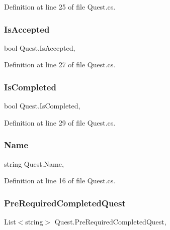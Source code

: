 Definition at line 25 of file Quest.\+cs.

\mbox{\label{class_quest_aa4cdb538ad95f876192f9e161e209448}} 
\subsubsection{\texorpdfstring{Is\+Accepted}{IsAccepted}}
{\footnotesize\ttfamily bool Quest.\+Is\+Accepted\hspace{0.3cm}{\ttfamily [get]}, {\ttfamily [set]}}



Definition at line 27 of file Quest.\+cs.

\mbox{\label{class_quest_a571b9ac9728e3fe099fef9f5b3c9b7ef}} 
\subsubsection{\texorpdfstring{Is\+Completed}{IsCompleted}}
{\footnotesize\ttfamily bool Quest.\+Is\+Completed\hspace{0.3cm}{\ttfamily [get]}, {\ttfamily [set]}}



Definition at line 29 of file Quest.\+cs.

\mbox{\label{class_quest_a0d12fe711350d850ead300f03926e6db}} 
\subsubsection{\texorpdfstring{Name}{Name}}
{\footnotesize\ttfamily string Quest.\+Name\hspace{0.3cm}{\ttfamily [get]}, {\ttfamily [set]}}



Definition at line 16 of file Quest.\+cs.

\mbox{\label{class_quest_ab6a42ba89f28e4871036bd097b1ab1dd}} 
\subsubsection{\texorpdfstring{Pre\+Required\+Completed\+Quest}{PreRequiredCompletedQuest}}
{\footnotesize\ttfamily List$<$string$>$ Quest.\+Pre\+Required\+Completed\+Quest\hspace{0.3cm}{\ttfamily [get]}, {\ttfamily [set]}}



